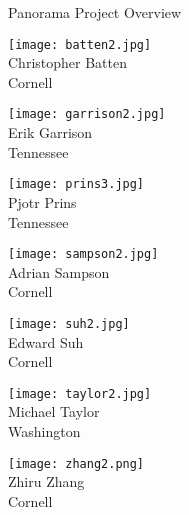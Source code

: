 \documentclass{cbxposter}
\renewcommand{\smallskip}{\vspace{0.16667in}}
\begin{document}
\begin{frame}[fragile,t]{}
\begin{columns}[T]
\begin{column}{10.5in}
\begin{block}{Panorama Project Overview}
  \begin{center}
  \begin{minipage}[t]{0.135\tw}
    \vspace{0pt}\centering
    \smallskip
    \texttt{[image: batten2.jpg]}\\
    \smallskip
    Christopher Batten\\[0.005in]
    Cornell
  \end{minipage}
  \begin{minipage}[t]{0.135\tw}
    \vspace{0pt}\centering
    \smallskip
    \texttt{[image: garrison2.jpg]}\\
    \smallskip
    Erik Garrison\\
    Tennessee
  \end{minipage}
  \begin{minipage}[t]{0.135\tw}
    \vspace{0pt}\centering
    \smallskip
    \texttt{[image: prins3.jpg]}\\
    \smallskip
    Pjotr Prins\\
    Tennessee
  \end{minipage}
  \begin{minipage}[t]{0.135\tw}
    \vspace{0pt}\centering
    \smallskip
    \texttt{[image: sampson2.jpg]}\\
    \smallskip
    Adrian Sampson\\
    Cornell
  \end{minipage}
  \begin{minipage}[t]{0.135\tw}
    \vspace{0pt}\centering
    \smallskip
    \texttt{[image: suh2.jpg]}\\
    \smallskip
    Edward Suh\\
    Cornell
  \end{minipage}
  \begin{minipage}[t]{0.135\tw}
    \vspace{0pt}\centering
    \smallskip
    \texttt{[image: taylor2.jpg]}\\
    \smallskip
    Michael Taylor\\
    Washington
  \end{minipage}
  \begin{minipage}[t]{0.135\tw}
    \vspace{0pt}\centering
    \smallskip
    \texttt{[image: zhang2.png]}\\
    \smallskip
    Zhiru Zhang\\
    Cornell
  \end{minipage}
\end{center}
\end{block}


\end{column}
\end{columns}
\end{frame}
\end{document}
